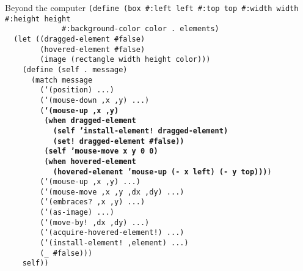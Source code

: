 \begin{frame}{Beyond the computer}
  \tiny
  \texttt{(define (box \#:left left \#:top top \#:width width \#:height height\\
    \ \ \ \ \ \ \ \ \ \ \ \ \ \#:background-color color .\ elements)\\
    \ \ (let ((dragged-element \#false)\\
    \ \ \ \ \ \ \ \ (hovered-element \#false)\\
    \ \ \ \ \ \ \ \ (image (rectangle width height color)))\\
    \ \ \ \ (define (self .\ message)\\
    \ \ \ \ \ \ (match message\\
    \ \ \ \ \ \ \ \ (`(position) ...)\\
    \ \ \ \ \ \ \ \ (`(mouse-down ,x ,y) ...)\\
    \ \ \ \ \ \ \ \ (\textbf{`(mouse-up ,x ,y)\\
    \ \ \ \ \ \ \ \ \ (when dragged-element\\
    \ \ \ \ \ \ \ \ \ \ \ (self 'install-element!\ dragged-element)\\
    \ \ \ \ \ \ \ \ \ \ \ (set!\ dragged-element \#false))\\
    \ \ \ \ \ \ \ \ \ (self 'mouse-move x y 0 0)\\
    \ \ \ \ \ \ \ \ \ (when hovered-element\\
    \ \ \ \ \ \ \ \ \ \ \ (hovered-element 'mouse-up (- x left) (- y top)))})\\
    \ \ \ \ \ \ \ \ (`(mouse-up ,x ,y) ...)\\
    \ \ \ \ \ \ \ \ (`(mouse-move ,x ,y ,dx ,dy) ...)\\
    \ \ \ \ \ \ \ \ (`(embraces?\ ,x ,y) ...)\\
    \ \ \ \ \ \ \ \ (`(as-image) ...)\\
    \ \ \ \ \ \ \ \ (`(move-by!\ ,dx ,dy) ...)\\
    \ \ \ \ \ \ \ \ (`(acquire-hovered-element!) ...)\\
    \ \ \ \ \ \ \ \ (`(install-element!\ ,element) ...)\\
    \ \ \ \ \ \ \ \ (\_ \#false)))\\
    \ \ \ \ self))} \\
  \ \\ \ \\ \ \\ \ \\ \ 
\end{frame}

